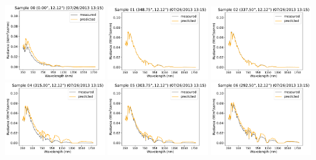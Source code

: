 \begin{center}
\includegraphics[width=0.325\textwidth]{img/07261315_s00.pdf}
\includegraphics[width=0.325\textwidth]{img/07261315_s01.pdf}
\includegraphics[width=0.325\textwidth]{img/07261315_s02.pdf}\\
\includegraphics[width=0.325\textwidth]{img/07261315_s04.pdf}
\includegraphics[width=0.325\textwidth]{img/07261315_s05.pdf}
\includegraphics[width=0.325\textwidth]{img/07261315_s06.pdf}\\

\end{center}
